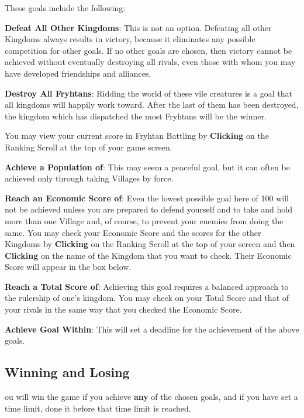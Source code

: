 These goals include the following:

\textbf{Defeat All Other Kingdoms}: This is not an option. Defeating all other Kingdoms always results in victory, because it eliminates any possible competition for other goals. If no other goals are chosen, then victory cannot be achieved without eventually destroying all rivals, even those with whom you may have developed friendships and alliances.

\textbf{Destroy All Fryhtans}: Ridding the world of these vile creatures is a goal that all kingdoms will happily work toward. After the last of them has been destroyed, the kingdom which has dispatched the most Fryhtans will be the winner.

You may view your current score in Fryhtan Battling by \textbf{Clicking} on the Ranking Scroll at the top of your game screen.

\textbf{Achieve a Population of}: This may seem a peaceful goal, but it can often be achieved only through taking Villages by force.

\textbf{Reach an Economic Score of}: Even the lowest possible goal here of 100 will not be achieved unless you are prepared to defend yourself and to take and hold more than one Village and, of course, to prevent your enemies from doing the same. You may check your Economic Score and the scores for the other Kingdoms by \textbf{Clicking} on the Ranking Scroll at the top of your screen and then \textbf{Clicking} on the name of the Kingdom that you want to check. Their Economic Score will appear in the box below.

\textbf{Reach a Total Score of}: Achieving this goal requires a balanced approach to the rulership of one’s kingdom. You may check on your Total Score and that of your rivals in the same way that you checked the Economic Score.

\textbf{Achieve Goal Within}: This will set a deadline for the achievement of the above goals.

\subsection{Winning and Losing}


ou will win the game if you achieve \textbf{any} of the chosen goals, and if you have set a time limit, done it before that time limit is reached.

